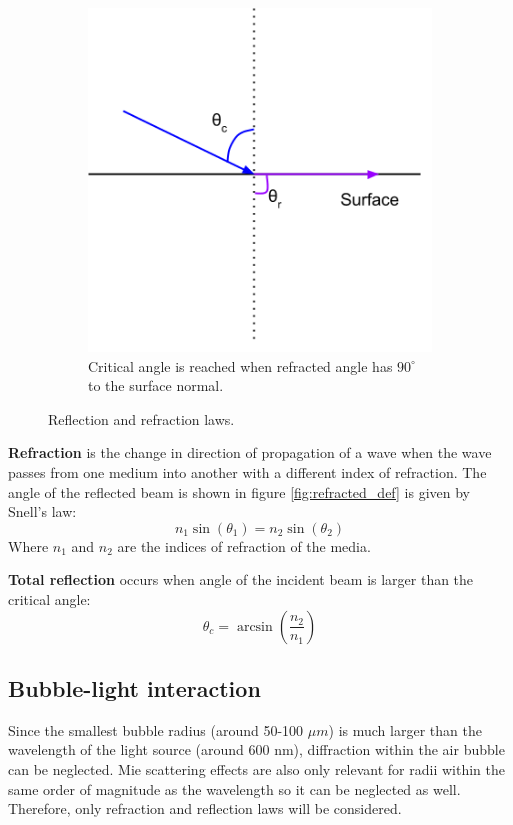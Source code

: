 \begin{figure}
		    \begin{subfigure}[t]{0.5\textwidth}
		        \includegraphics[width=\textwidth]{images/total_reflection.png}
		        \caption{Critical angle is reached when refracted angle has $90^\circ$ to the surface normal.}
		        \label{fig:total_reflected_def}
		    \end{subfigure}
		    \caption{Reflection and refraction laws.}
	 		\end{figure}	
			
			\textbf{Refraction} is the change in direction of propagation of a wave when the wave passes from one medium into another with a different index of refraction. The angle of the reflected beam is shown in figure \ref{fig:refracted_def} is given by Snell's law:
			\begin{equation}
				n_1 \sin(\theta_1) = n_2 \sin(\theta_2)
			\end{equation}
				Where $n_1$ and $n_2$ are the indices of refraction of the media.
				
				\textbf{Total reflection} occurs when angle of the incident beam is larger than the critical angle:
				\begin{equation}
					\theta_c = \arcsin\left(\dfrac{n_2}{n_1}\right)
				\end{equation}
				
				
		\subsection{Bubble-light interaction}
			Since the smallest bubble radius (around 50-100 $\mu m$) is much larger than the wavelength of the light source (around 600 nm), diffraction within the air bubble can be neglected. Mie scattering effects are also only relevant for radii within the same order of magnitude as the wavelength \citep{Demtroeder2} so it can be neglected as well. Therefore, only refraction and reflection laws will be considered. 
			
